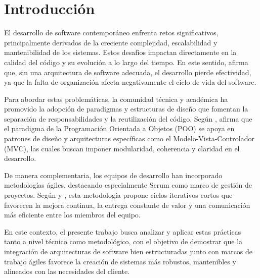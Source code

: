 \section{Introducción}
El desarrollo de software contemporáneo enfrenta retos significativos, principalmente derivados de la creciente complejidad, escalabilidad y mantenibilidad de los sistemas. Estos desafíos impactan directamente en la calidad del código y su evolución a lo largo del tiempo. En este sentido, \cite{vera2022arquitectura} afirma que, sin una arquitectura de software adecuada, el desarrollo pierde efectividad, ya que la falta de organización afecta negativamente el ciclo de vida del software.

Para abordar estas problemáticas, la comunidad técnica y académica ha promovido la adopción de paradigmas y estructuras de diseño que fomentan la separación de responsabilidades y la reutilización del código. Según \cite{gavilanez2022analisis}, afirma que el paradigma de la Programación Orientada a Objetos (POO) se apoya en patrones de diseño y arquitecturas específicas como el Modelo-Vista-Controlador (MVC), las cuales buscan imponer modularidad, coherencia y claridad en el desarrollo.

De manera complementaria, los equipos de desarrollo han incorporado metodologías ágiles, destacando especialmente Scrum como marco de gestión de proyectos. Según \cite{marco2022revision} y \cite{merchan2022comparacion}, esta metodología propone ciclos iterativos cortos que favorecen la mejora continua, la entrega constante de valor y una comunicación más eficiente entre los miembros del equipo.

En este contexto, el presente trabajo busca analizar y aplicar estas prácticas tanto a nivel técnico como metodológico, con el objetivo de demostrar que la integración de arquitecturas de software bien estructuradas junto con marcos de trabajo ágiles favorece la creación de sistemas más robustos, mantenibles y alineados con las necesidades del cliente.